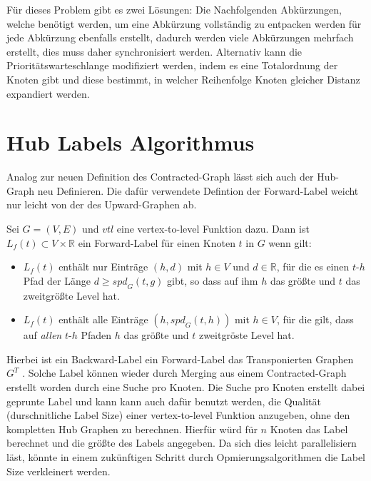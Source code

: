 Für dieses Problem gibt es zwei Lösungen:
Die Nachfolgenden Abkürzungen, welche benötigt werden, um eine Abkürzung vollständig zu entpacken werden für jede Abkürzung ebenfalls erstellt, dadurch werden viele Abkürzungen mehrfach erstellt, dies muss daher synchronisiert werden.
Alternativ kann die Prioritätswarteschlange modifiziert werden, indem es eine Totalordnung der Knoten gibt und diese bestimmt, in welcher Reihenfolge Knoten gleicher Distanz expandiert werden.

\section{Hub Labels Algorithmus}

Analog zur neuen Definition des Contracted-Graph lässt sich auch der Hub-Graph neu Definieren.
Die dafür verwendete Defintion der Forward-Label weicht nur leicht von der des Upward-Graphen ab.

\begin{definition}
  Sei $G = (V, E)$ und ${vtl}$ eine vertex-to-level Funktion dazu.
  Dann ist $L_f (t) \subset V \times \mathbb{R}$ ein Forward-Label für einen Knoten $t$ in $G$ wenn gilt:

  \begin{itemize}
    \item
          $L_f (t)$ enthält nur Einträge $(h, d)$ mit $h \in V$ und $d \in \mathbb{R}$, für die es einen $t$-$h$ Pfad der Länge $d \geq {spd}_G (t, g)$ gibt, so dass auf ihm $h$ das größte und $t$ das zweitgrößte Level hat.

    \item
          $L_f (t)$ enthält alle Einträge $(h, {spd}_G (t, h))$ mit $h \in V$, für die gilt, dass auf \emph{allen} $t$-$h$ Pfaden $h$ das größte und $t$ zweitgröste Level hat.
  \end{itemize}
\end{definition}

Hierbei ist ein Backward-Label ein Forward-Label das Transponierten Graphen $G^T$ .
Solche Label können wieder durch Merging aus einem Contracted-Graph erstellt worden durch eine Suche pro Knoten.
Die Suche pro Knoten erstellt dabei geprunte Label und kann kann auch dafür benutzt werden, die Qualität (durschnitliche Label Size) einer vertex-to-level Funktion anzugeben, ohne den kompletten Hub Graphen zu berechnen.
Hierfür würd für $n$ Knoten das Label berechnet und die größte des Labels angegeben.
Da sich dies leicht parallelisiern läst, könnte in einem zukünftigen Schritt durch Opmierungsalgorithmen die Label Size verkleinert werden.
